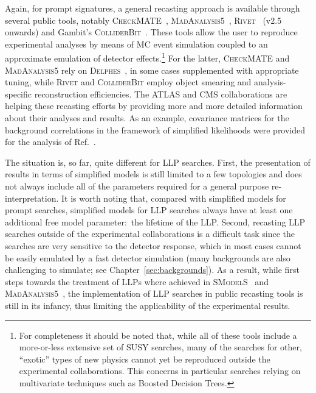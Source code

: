 Again, for prompt signatures, a general recasting approach is available through several public
tools, notably \textsc{CheckMATE}~\cite{Drees:2013wra,Dercks:2016npn}, \textsc{MadAnalysis5}~\cite{Conte:2014zja,Dumont:2014tja},
\textsc{Rivet}~{\bf\cite{Buckley:2010ar}} (v2.5 onwards) and Gambit's \textsc{ColliderBit}~\cite{Balazs:2017moi}.
These tools allow the user to reproduce experimental analyses by means of MC event simulation coupled to
an approximate emulation of detector effects.\footnote{For completeness it should be noted that, while all of these tools include a more-or-less
extensive set of SUSY searches, many of the searches for other, ``exotic'' types of new physics cannot yet be reproduced outside the experimental collaborations. This concerns in particular searches relying on multivariate techniques such as Boosted Decision Trees.}
For the latter, \textsc{CheckMATE} and \textsc{MadAnalysis5} rely on \textsc{Delphes}~\cite{deFavereau:2013fsa},
in some cases supplemented with appropriate tuning,
while \textsc{Rivet} and \textsc{ColliderBit} employ object smearing and analysis-specific reconstruction efficiencies.
The ATLAS and CMS collaborations are helping these recasting efforts by providing more and more
detailed information about their analyses and results. As an example, covariance matrices for the background correlations in the framework of simplified likelihoods were provided for the analysis of Ref.~\cite{CMS-NOTE-2017-001}.

The situation is, so far, quite different for LLP searches.
First, the presentation of results in terms of simplified models
is still limited to a few topologies and does not always include all of the
parameters required for a general purpose re-interpretation.
It is worth noting that, compared with simplified models for prompt searches, simplified models
for LLP searches always have at least one additional free model parameter:~the lifetime of the LLP.
Second, %
recasting LLP searches outside of the experimental collaborations is  a
difficult task since the searches are very sensitive to the detector response, which in most cases
cannot be easily emulated  by a fast detector simulation (many backgrounds are also challenging to simulate; see
Chapter~\ref{sec:backgrounds}).
As a result, %
while first steps towards the treatment of LLPs where achieved in \textsc{SModelS}~\cite{Heisig:2018kfq} and
\textsc{MadAnalysis5}~\cite{MA5:longlivedleptons}, the implementation of LLP searches in public recasting tools is
still in its infancy, thus limiting the applicability of the experimental results.


